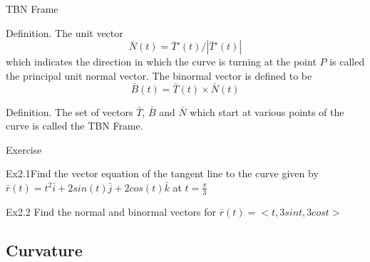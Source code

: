 \documentclass{beamer}
\begin{document}
    \begin{frame}[t]{TBN Frame}
        \begin{block}
            \par \textcolor{yy}{Definition.} The unit vector $$\bar{N} (t) = \bar{T}'(t) / |\bar{T}'(t)|$$ which indicates the direction in which the curve is turning at the point $P$ is called the \textcolor{yy}{principal unit normal vector}.
            The binormal vector is defined to be
            \begin{equation*}
                \bar{B}(t) = \bar{T}(t) \times \bar{N}(t)
            \end{equation*}
        \end{block}

        \begin{block}
            \par \textcolor{yy}{Definition.} The set of vectors $\bar{T}$, $\bar{B}$ and $\bar{N}$ which start at various points of the curve is called the \textcolor{yy}{TBN Frame}.
        \end{block}
    \end{frame}

\begin{frame}[t]{Exercise}
    \par \textcolor{yy}{Ex2.1}Find the vector equation of the tangent line to the curve given by $\bar{r}(t) = t^2\bar{i}+2sin(t)\bar{j}+2cos(t)\bar{k}$ at $t = \frac{\pi}{3}$
    \par \textcolor{yy}{Ex2.2} Find the normal and binormal vectors for $\bar{r}(t) = <t, 3sint, 3cost>$
\end{frame}

    \subsection{Curvature} 
\end{document}
